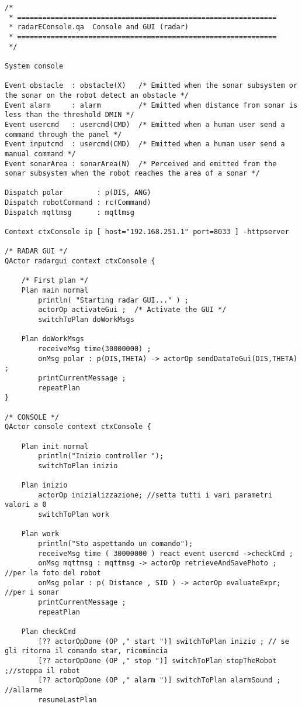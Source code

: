 \documentclass[a4paper]{article}
\begin{document}
\begin{lstlisting}
/* 
 * ==============================================================
 * radarEConsole.qa  Console and GUI (radar)
 * ==============================================================
 */
 
System console

Event obstacle  : obstacle(X)   /* Emitted when the sonar subsystem or the sonar on the robot detect an obstacle */
Event alarm     : alarm         /* Emitted when distance from sonar is less than the threshold DMIN */
Event usercmd   : usercmd(CMD)  /* Emitted when a human user send a command through the panel */
Event inputcmd  : usercmd(CMD)  /* Emitted when a human user send a manual command */
Event sonarArea : sonarArea(N)  /* Perceived and emitted from the sonar subsystem when the robot reaches the area of a sonar */

Dispatch polar        : p(DIS, ANG)
Dispatch robotCommand : rc(Command)
Dispatch mqttmsg      : mqttmsg

Context ctxConsole ip [ host="192.168.251.1" port=8033 ] -httpserver

/* RADAR GUI */
QActor radargui context ctxConsole {
	
	/* First plan */
	Plan main normal
		println( "Starting radar GUI..." ) ;     
		actorOp activateGui ;  /* Activate the GUI */
		switchToPlan doWorkMsgs

	Plan doWorkMsgs
		receiveMsg time(30000000) ;		
   		onMsg polar : p(DIS,THETA) -> actorOp sendDataToGui(DIS,THETA) ;
   		printCurrentMessage ;
 		repeatPlan  
}

/* CONSOLE */
QActor console context ctxConsole {

	Plan init normal
		println("Inizio controller ");
		switchToPlan inizio
	
	Plan inizio
		actorOp inizializzazione; //setta tutti i vari parametri valori a 0
		switchToPlan work
	
	Plan work 
		println("Sto aspettando un comando");
		receiveMsg time ( 30000000 ) react event usercmd ->checkCmd ;
		onMsg mqttmsg : mqttmsg -> actorOp retrieveAndSavePhoto ; //per la foto del robot
		onMsg polar : p( Distance , SID ) -> actorOp evaluateExpr; //per i sonar 
		printCurrentMessage ;
		repeatPlan
	
	Plan checkCmd
		[?? actorOpDone (OP ," start ")] switchToPlan inizio ; // se gli ritorna il comando star, ricomincia
		[?? actorOpDone (OP ," stop ")] switchToPlan stopTheRobot ;//stoppa il robot
		[?? actorOpDone (OP ," alarm ")] switchToPlan alarmSound ; //allarme
		resumeLastPlan
	


\end{lstlisting}
\end{document}
